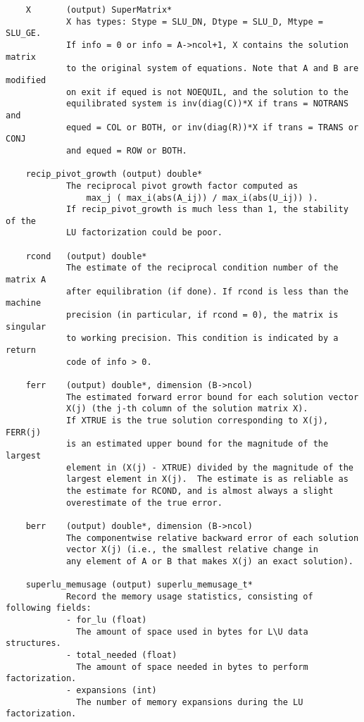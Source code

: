 \begin{verbatim}
    X       (output) SuperMatrix*
            X has types: Stype = SLU_DN, Dtype = SLU_D, Mtype = SLU_GE. 
            If info = 0 or info = A->ncol+1, X contains the solution matrix
            to the original system of equations. Note that A and B are modified
            on exit if equed is not NOEQUIL, and the solution to the 
            equilibrated system is inv(diag(C))*X if trans = NOTRANS and
            equed = COL or BOTH, or inv(diag(R))*X if trans = TRANS or CONJ
            and equed = ROW or BOTH.

    recip_pivot_growth (output) double*
            The reciprocal pivot growth factor computed as
                max_j ( max_i(abs(A_ij)) / max_i(abs(U_ij)) ).
            If recip_pivot_growth is much less than 1, the stability of the
            LU factorization could be poor.

    rcond   (output) double*
            The estimate of the reciprocal condition number of the matrix A
            after equilibration (if done). If rcond is less than the machine
            precision (in particular, if rcond = 0), the matrix is singular
            to working precision. This condition is indicated by a return
            code of info > 0.

    ferr    (output) double*, dimension (B->ncol)   
            The estimated forward error bound for each solution vector   
            X(j) (the j-th column of the solution matrix X).   
            If XTRUE is the true solution corresponding to X(j), FERR(j) 
            is an estimated upper bound for the magnitude of the largest 
            element in (X(j) - XTRUE) divided by the magnitude of the   
            largest element in X(j).  The estimate is as reliable as   
            the estimate for RCOND, and is almost always a slight   
            overestimate of the true error.

    berr    (output) double*, dimension (B->ncol)
            The componentwise relative backward error of each solution   
            vector X(j) (i.e., the smallest relative change in   
            any element of A or B that makes X(j) an exact solution).

    superlu_memusage (output) superlu_memusage_t*
            Record the memory usage statistics, consisting of following fields:
            - for_lu (float)
              The amount of space used in bytes for L\U data structures.
            - total_needed (float)
              The amount of space needed in bytes to perform factorization.
            - expansions (int)
              The number of memory expansions during the LU factorization.


\end{verbatim}
